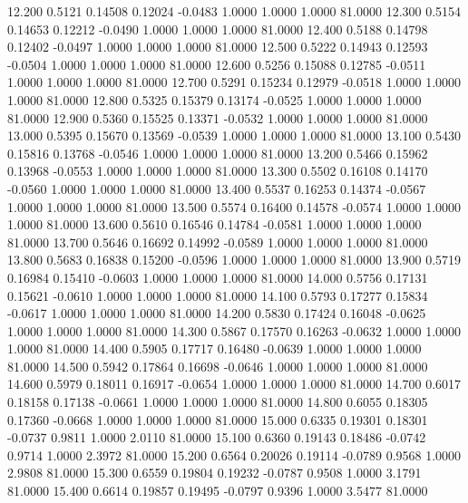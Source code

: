   12.200   0.5121   0.14508   0.12024  -0.0483   1.0000   1.0000   1.0000  81.0000
  12.300   0.5154   0.14653   0.12212  -0.0490   1.0000   1.0000   1.0000  81.0000
  12.400   0.5188   0.14798   0.12402  -0.0497   1.0000   1.0000   1.0000  81.0000
  12.500   0.5222   0.14943   0.12593  -0.0504   1.0000   1.0000   1.0000  81.0000
  12.600   0.5256   0.15088   0.12785  -0.0511   1.0000   1.0000   1.0000  81.0000
  12.700   0.5291   0.15234   0.12979  -0.0518   1.0000   1.0000   1.0000  81.0000
  12.800   0.5325   0.15379   0.13174  -0.0525   1.0000   1.0000   1.0000  81.0000
  12.900   0.5360   0.15525   0.13371  -0.0532   1.0000   1.0000   1.0000  81.0000
  13.000   0.5395   0.15670   0.13569  -0.0539   1.0000   1.0000   1.0000  81.0000
  13.100   0.5430   0.15816   0.13768  -0.0546   1.0000   1.0000   1.0000  81.0000
  13.200   0.5466   0.15962   0.13968  -0.0553   1.0000   1.0000   1.0000  81.0000
  13.300   0.5502   0.16108   0.14170  -0.0560   1.0000   1.0000   1.0000  81.0000
  13.400   0.5537   0.16253   0.14374  -0.0567   1.0000   1.0000   1.0000  81.0000
  13.500   0.5574   0.16400   0.14578  -0.0574   1.0000   1.0000   1.0000  81.0000
  13.600   0.5610   0.16546   0.14784  -0.0581   1.0000   1.0000   1.0000  81.0000
  13.700   0.5646   0.16692   0.14992  -0.0589   1.0000   1.0000   1.0000  81.0000
  13.800   0.5683   0.16838   0.15200  -0.0596   1.0000   1.0000   1.0000  81.0000
  13.900   0.5719   0.16984   0.15410  -0.0603   1.0000   1.0000   1.0000  81.0000
  14.000   0.5756   0.17131   0.15621  -0.0610   1.0000   1.0000   1.0000  81.0000
  14.100   0.5793   0.17277   0.15834  -0.0617   1.0000   1.0000   1.0000  81.0000
  14.200   0.5830   0.17424   0.16048  -0.0625   1.0000   1.0000   1.0000  81.0000
  14.300   0.5867   0.17570   0.16263  -0.0632   1.0000   1.0000   1.0000  81.0000
  14.400   0.5905   0.17717   0.16480  -0.0639   1.0000   1.0000   1.0000  81.0000
  14.500   0.5942   0.17864   0.16698  -0.0646   1.0000   1.0000   1.0000  81.0000
  14.600   0.5979   0.18011   0.16917  -0.0654   1.0000   1.0000   1.0000  81.0000
  14.700   0.6017   0.18158   0.17138  -0.0661   1.0000   1.0000   1.0000  81.0000
  14.800   0.6055   0.18305   0.17360  -0.0668   1.0000   1.0000   1.0000  81.0000
  15.000   0.6335   0.19301   0.18301  -0.0737   0.9811   1.0000   2.0110  81.0000
  15.100   0.6360   0.19143   0.18486  -0.0742   0.9714   1.0000   2.3972  81.0000
  15.200   0.6564   0.20026   0.19114  -0.0789   0.9568   1.0000   2.9808  81.0000
  15.300   0.6559   0.19804   0.19232  -0.0787   0.9508   1.0000   3.1791  81.0000
  15.400   0.6614   0.19857   0.19495  -0.0797   0.9396   1.0000   3.5477  81.0000

